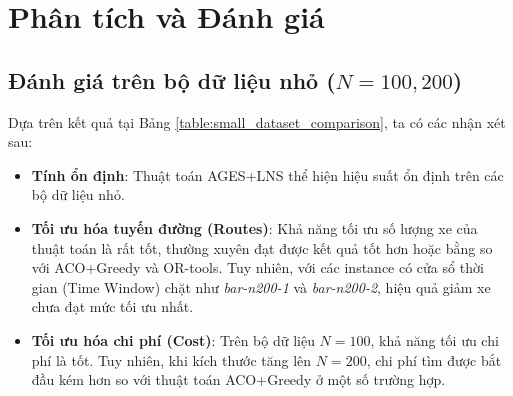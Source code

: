 \documentclass[../DoAn.tex]{subfiles}
\begin{document}
	\begin{table}[h!]
		\centering
		\caption{Kết quả thực nghiệm trên bộ dữ liệu lớn}
		\label{table:large_dataset_comparison}
	\end{table}

	\section{Phân tích và Đánh giá}

    \subsection{Đánh giá trên bộ dữ liệu nhỏ ($N=100, 200$)}
    Dựa trên kết quả tại Bảng \ref{table:small_dataset_comparison}, ta có các nhận xét sau:
    \begin{itemize}
        \item \textbf{Tính ổn định}: Thuật toán AGES+LNS thể hiện hiệu suất ổn định trên các bộ dữ liệu nhỏ.
        \item \textbf{Tối ưu hóa tuyến đường (Routes)}: Khả năng tối ưu số lượng xe của thuật toán là rất tốt, thường xuyên đạt được kết quả tốt hơn hoặc bằng so với ACO+Greedy và OR-tools. Tuy nhiên, với các instance có cửa sổ thời gian (Time Window) chặt như \textit{bar-n200-1} và \textit{bar-n200-2}, hiệu quả giảm xe chưa đạt mức tối ưu nhất.
        \item \textbf{Tối ưu hóa chi phí (Cost)}: Trên bộ dữ liệu $N=100$, khả năng tối ưu chi phí là tốt. Tuy nhiên, khi kích thước tăng lên $N=200$, chi phí tìm được bắt đầu kém hơn so với thuật toán ACO+Greedy ở một số trường hợp.
    \end{itemize}
\end{document}

